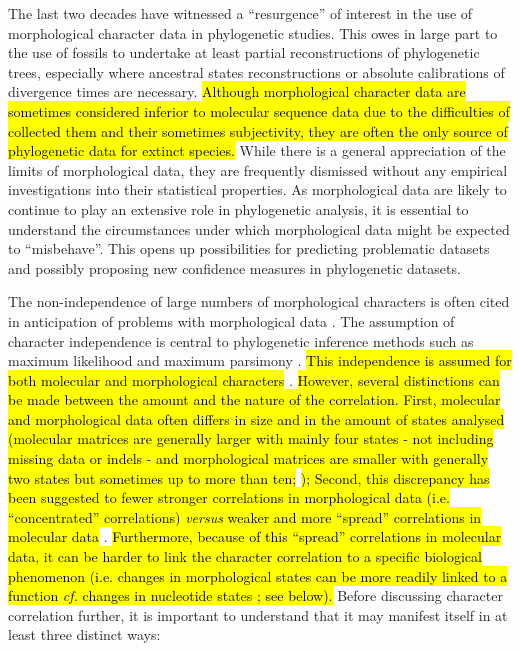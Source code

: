 \documentclass[12pt,letterpaper]{article}
\begin{document}
The last two decades have witnessed a ``resurgence'' of interest in the use of morphological character data in phylogenetic studies.
This owes in large part to the use of fossils to undertake at least partial reconstructions of phylogenetic trees, especially where ancestral states reconstructions or absolute calibrations of divergence times are necessary. 
\hl{Although morphological character data are sometimes considered inferior to molecular sequence data due to the difficulties of collected them and their sometimes subjectivity, they are often the only source of phylogenetic data for extinct species.}
While there is a general appreciation of the limits of morphological data, they are frequently dismissed without any empirical investigations into their statistical properties.
As morphological data are likely to continue to play an extensive role in phylogenetic analysis, it is essential to understand the circumstances under which morphological data might be expected to ``misbehave''.
This opens up possibilities for predicting problematic datasets and possibly proposing new confidence measures in phylogenetic datasets.

The non-independence of large numbers of morphological characters is often cited in anticipation of problems with morphological data \cite[e.g.][]{Davalos01072014, ZouConvergence}.
The assumption of character independence is central to phylogenetic inference methods such as maximum likelihood and maximum parsimony \citep[e.g.][]{joysey1982problems,felsenstein1985phylogenies,lewisa2001,felsenstein2004inferring}.
\hl{This independence is assumed for both molecular and morphological characters} \citep{huelsenbeck1999effect,Davalos01072014,ZouConvergence}.
\hl{However, several distinctions can be made between the amount and the nature of the correlation.
First, molecular and morphological data often differs in size and in the amount of states analysed (molecular matrices are generally larger with mainly four states - not including missing data or indels - and morphological matrices are smaller with generally two states but sometimes up to more than ten;}
\citealt{Guillerme2016146}
\hl{);
Second, this discrepancy has been suggested to fewer stronger correlations in morphological data (i.e. ``concentrated'' correlations) \textit{versus} weaker and more ``spread'' correlations in molecular data}
\citep[\hl{i.e. ``diffused'' correlations - though some regions of the genome can be thought as more correlated than others}][]{huelsenbeck1999effect}.
\hl{Furthermore, because of this ``spread'' correlations in molecular data, it can be harder to link the character correlation to a specific biological phenomenon (i.e. changes in morphological states can be more readily linked to a function \textit{cf.} changes in nucleotide states ; see below).}
Before discussing character correlation further, it is important to understand that it may manifest itself in at least three distinct ways:
\end{document}
